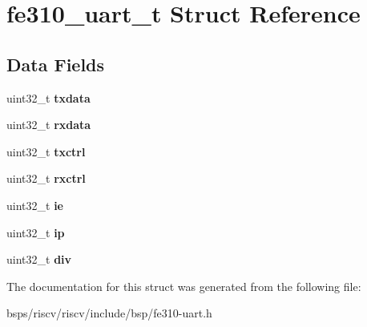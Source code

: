 \hypertarget{structfe310__uart__t}{}\section{fe310\+\_\+uart\+\_\+t Struct Reference}
\label{structfe310__uart__t}
\subsection*{Data Fields}
\begin{DoxyCompactItemize}
\item 
\mbox{\label{structfe310__uart__t_aba3a73612601c7eb2f20c9dd20e34bfa}} 
uint32\+\_\+t {\bfseries txdata}
\item 
\mbox{\label{structfe310__uart__t_a2fd2d535d724716ef50572f991d50e85}} 
uint32\+\_\+t {\bfseries rxdata}
\item 
\mbox{\label{structfe310__uart__t_a338f4e0cb9fc7c14d26cbf235bbf6db1}} 
uint32\+\_\+t {\bfseries txctrl}
\item 
\mbox{\label{structfe310__uart__t_a619cc5fbc58eb3312cc8d67b729ecf26}} 
uint32\+\_\+t {\bfseries rxctrl}
\item 
\mbox{\label{structfe310__uart__t_afeb6f64ef133f397762e84c3eaea0203}} 
uint32\+\_\+t {\bfseries ie}
\item 
\mbox{\label{structfe310__uart__t_a328e76cbadfd6e36c71696aab33783b0}} 
uint32\+\_\+t {\bfseries ip}
\item 
\mbox{\label{structfe310__uart__t_ad6f04a73933819931272099ebec3bcf4}} 
uint32\+\_\+t {\bfseries div}
\end{DoxyCompactItemize}


The documentation for this struct was generated from the following file\+:\begin{DoxyCompactItemize}
\item 
bsps/riscv/riscv/include/bsp/fe310-\/uart.\+h\end{DoxyCompactItemize}
